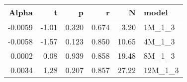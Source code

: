 \begin{table}[ht]
\centering
\begin{tabular}{rrrrrl}
  \hline
Alpha & t & p & r & N & model \\ 
  \hline
-0.0059 & -1.01 & 0.320 & 0.674 & 3.20 & 1M\_1\_3 \\ 
  -0.0058 & -1.57 & 0.123 & 0.850 & 10.65 & 4M\_1\_3 \\ 
  0.0002 & 0.08 & 0.939 & 0.858 & 19.48 & 8M\_1\_3 \\ 
  0.0034 & 1.28 & 0.207 & 0.857 & 27.22 & 12M\_1\_3 \\ 
   \hline
\end{tabular}
\end{table}

